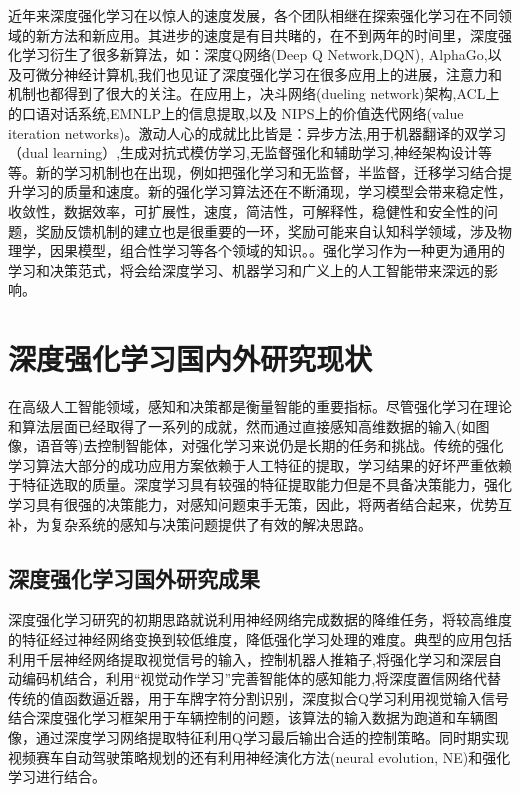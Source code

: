 近年来深度强化学习在以惊人的速度发展，各个团队相继在探索强化学习在不同领域的新方法和新应用。其进步的速度是有目共睹的，在不到两年的时间里，深度强化学习衍生了很多新算法，如：深度Q网络(Deep Q Network,DQN)\cite{Roderick2017Implementing}, AlphaGo\cite{Silver2016Mastering},以及可微分神经计算机\cite{Graves2016Hybrid},我们也见证了深度强化学习在很多应用上的进展，注意力和机制也都得到了很大的关注。在应用上，决斗网络(dueling network)架构\cite{Wang2015Dueling},ACL上的口语对话系统\cite{Su2016On},EMNLP上的信息提取\cite{Narasimhan2016Improving},以及 NIPS上的价值迭代网络(value iteration networks)\cite{Tamar2017Value}。激动人心的成就比比皆是：异步方法\cite{Mnih2016Asynchronous},用于机器翻译的双学习（dual learning）\cite{Xia2016Dual},生成对抗式模仿学习\cite{Ho2016Generative},无监督强化和辅助学习\cite{Jaderberg2016Reinforcement},神经架构设计\cite{Pham2018Efficient}等等。新的学习机制也在出现，例如把强化学习和无监督，半监督，迁移学习结合提升学习的质量和速度。新的强化学习算法还在不断涌现，学习模型会带来稳定性，收敛性，数据效率，可扩展性，速度，简洁性，可解释性，稳健性和安全性的问题，奖励反馈机制的建立也是很重要的一环，奖励可能来自认知科学领域，涉及物理学，因果模型，组合性学习等各个领域的知识。。强化学习作为一种更为通用的学习和决策范式，将会给深度学习、机器学习和广义上的人工智能带来深远的影响。

\section{深度强化学习国内外研究现状}
在高级人工智能领域，感知和决策都是衡量智能的重要指标。尽管强化学习在理论和算法层面已经取得了一系列的成就，然而通过直接感知高维数据的输入(如图像，语音等)去控制智能体，对强化学习来说仍是长期的任务和挑战。传统的强化学习算法大部分的成功应用方案依赖于人工特征的提取，学习结果的好坏严重依赖于特征选取的质量。深度学习具有较强的特征提取能力但是不具备决策能力，强化学习具有很强的决策能力，对感知问题束手无策，因此，将两者结合起来，优势互补，为复杂系统的感知与决策问题提供了有效的解决思路。

\subsection{深度强化学习国外研究成果}
深度强化学习研究的初期思路就说利用神经网络完成数据的降维任务，将较高维度的特征经过神经网络变换到较低维度，降低强化学习处理的难度。典型的应用包括利用千层神经网络提取视觉信号的输入，控制机器人推箱子\cite{Shibata2003Acquisition},将强化学习和深层自动编码机结合，利用“视觉动作学习”完善智能体的感知能力\cite{Lange2010Deep},将深度置信网络代替传统的值函数逼近器，用于车牌字符分割识别\cite{Abtahi2015A}，深度拟合Q学习\cite{Lange2012Autonomousd}利用视觉输入信号结合深度强化学习框架用于车辆控制的问题，该算法的输入数据为跑道和车辆图像，通过深度学习网络提取特征利用Q学习最后输出合适的控制策略。同时期实现视频赛车自动驾驶策略规划的还有利用神经演化方法(neural evolution, NE)和强化学习进行结合\cite{Kumar2014Understanding}。

